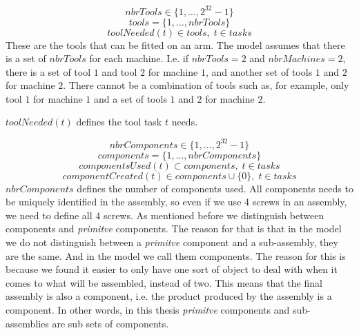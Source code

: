  \begin{equation}\label{eq:3}
 nbrTools \in \{1 , \ldots , 2^{32}-1\}
 \end{equation}
 \begin{equation}\label{eq:12}
 tools = \{1 , \ldots , nbrTools\}
 \end{equation}
 \begin{equation}\label{eq:33}
 toolNeeded(t) \in tools, \; t \in tasks
 \end{equation} 
 These are the tools that can be fitted on an arm. The model assumes that there is a set of $nbrTools$ for each machine. I.e. if $nbrTools = 2$ and $nbrMachines = 2$, there is a set of tool $1$ and tool $2$ for machine $1$, and another set of tools $1$ and $2$ for machine $2$. There cannot be a combination of tools such as, for example, only tool $1$ for machine $1$ and a set of tools $1$ and $2$ for machine $2$.
 
 $toolNeeded(t)$ defines the tool task $t$ needs.
 
 \begin{equation}\label{eq:6}
 nbrComponents \in \{1 , \ldots , 2^{32}-1\}
 \end{equation}
 \begin{equation}\label{eq:13}
 components = \{1 , \ldots , nbrComponents\}
 \end{equation}
 \begin{equation}\label{eq:25}
 componentsUsed(t) \subset components, \; t \in tasks
 \end{equation}
 \begin{equation}\label{eq:componentCreated}
 componentCreated(t) \in components \cup \{0\}, \; t \in tasks
 \end{equation}
 $nbrComponents$ defines the number of components used. All components needs to be uniquely identified in the assembly, so even if we use 4 screws in an assembly, we need to define all 4 screws. As mentioned before we distinguish between components and \emph{primitve} components. The reason for that is that in the model we do not distinguish between a \emph{primitve} component and a sub-assembly, they are the same. And in the model we call them components. The reason for this is because we found it easier to only have one sort of object to deal with when it comes to what will be assembled, instead of two. This means that the final assembly is also a component, i.e. the product produced by the assembly is a component. In other words, in this thesis \emph{primitve} components and sub-assemblies are sub sets of components.
 
